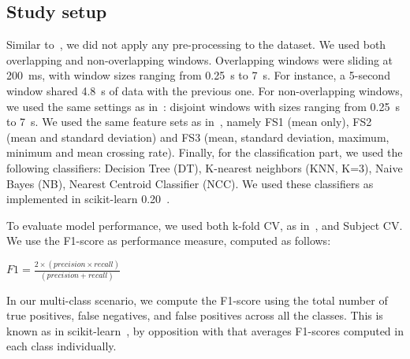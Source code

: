 \documentclass[sigconf]{acmart}
\begin{document}

\subsection{Study setup} %

 Similar to~\cite{banos2014window}, we did not apply any pre-processing to the dataset. We used both overlapping and non-overlapping windows. Overlapping windows were sliding at 200~ms, with window sizes ranging from 0.25~s to 7~s. For instance, a 5-second window shared 4.8~s of data with the previous one. For non-overlapping windows, we used the same settings as in~\cite{banos2014window}: disjoint windows with sizes ranging from 0.25~s to 7~s. We used the same feature sets as in~\cite{banos2014window}, namely FS1 (mean only), FS2 (mean and standard deviation) and FS3 (mean, standard deviation, maximum, minimum and mean crossing rate). Finally, for the classification part, we used the following classifiers: Decision Tree (DT), K-nearest neighbors (KNN, K=3), Naive Bayes (NB), Nearest Centroid Classifier (NCC). We used these classifiers as implemented in scikit-learn 0.20~\cite{pedregosa2011scikit}.
 
 To evaluate model performance, we used both k-fold CV, as in~\cite{banos2014window}, and Subject CV. We use the F1-score as performance measure, computed as follows:
 \begin{center}
      $F1= \frac{2\times(precision \times recall)}{(precision + recall)}$
 \end{center}
In our multi-class scenario, we compute the F1-score using the total number of true positives, false negatives, and false positives across all the classes. This is known as  in scikit-learn~\cite{pedregosa2011scikit}, by opposition with  that averages F1-scores computed in each class individually.

\end{document}
